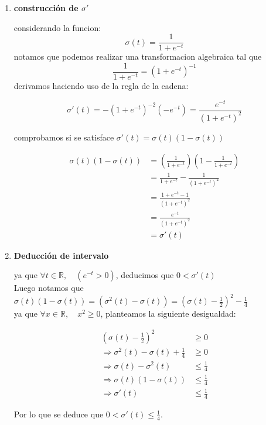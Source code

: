 \documentclass{article}
\begin{document}
\begin{enumerate}[label=\roman*]
  \item \textbf{construcción de $\sigma'$}
  
  considerando la funcion:
  \[\sigma(t)=\frac{1}{1+e^{-t}}\]
  notamos que podemos realizar una transformacion algebraica tal que
  \[\frac{1}{1+e^{-t}} = (1+e^{-t})^{-1}\]
  derivamos haciendo uso de la regla de la cadena:

  \[\sigma'(t)=-(1+e^{-t})^{-2}(-e^{-t}) = \frac{e^{-t}}{(1+e^{-t})^{2}}\]

  comprobamos si se satisface $\sigma'(t) = \sigma(t)(1 - \sigma(t))$

  \[
  \begin{aligned}
  \sigma(t)(1-\sigma(t))
  &= (\frac{1}{1+e^{-t}})(1 - \frac{1}{1+e^{-t}})\\
  &= \frac{1}{1+e^{-t}} - \frac{1}{(1+e^{-t})^2}\\
  &= \frac{1 + e^{-t} - 1}{(1+e^{-t})^2}\\
  &= \frac{e^{-t}}{(1+e^{-t})^2}\\
  &= \sigma'(t)
  \end{aligned}
  \]

  \bigskip\bigskip\bigskip\bigskip\bigskip\bigskip\bigskip\bigskip\bigskip\bigskip\bigskip\bigskip\bigskip
  
  \item \textbf{Deducción de intervalo}

  ya que $\forall t \in \mathbb{R}, \quad (e^{-t} > 0)$, deducimos que $0 < \sigma'(t)$\\
  Luego notamos que $\sigma(t)(1 - \sigma(t)) = (\sigma^2(t) - \sigma(t)) = (\sigma(t) - \frac{1}{2})^2 - \frac{1}{4}$\\
  ya que $\forall x \in \mathbb{R}, \quad x^2 \geq 0$, planteamos la siguiente desigualdad:


  \[
  \begin{aligned}
  (\sigma(t) - \frac{1}{2})^2 &\geq 0\\
  \Rightarrow \sigma^2(t) - \sigma(t) + \frac{1}{4} &\geq 0\\
  \Rightarrow \sigma(t) - \sigma^2(t) &\leq \frac{1}{4}\\
  \Rightarrow \sigma(t)(1-\sigma(t)) &\leq \frac{1}{4}\\
  \Rightarrow \sigma'(t) &\leq \frac{1}{4}
  \end{aligned}
  \]

  Por lo que se deduce que $0 < \sigma'(t) \leq \frac{1}{4}$.


\end{enumerate}
\end{document}
